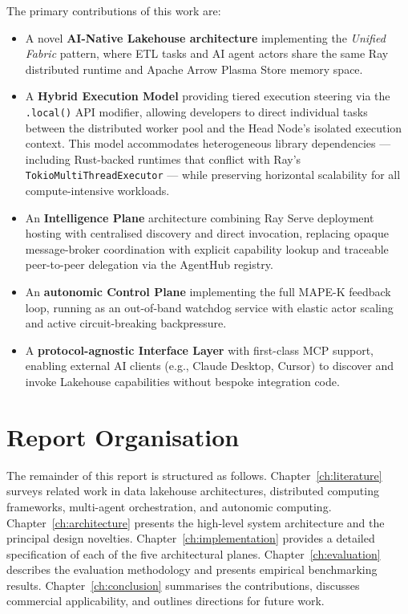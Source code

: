 \documentclass[12pt, a4paper]{report}
\begin{document}
The primary contributions of this work are:

\begin{itemize}

  \item A novel \textbf{AI-Native Lakehouse architecture} implementing the
  \emph{Unified Fabric} pattern, where ETL tasks and AI agent actors share the same Ray
  distributed runtime and Apache Arrow Plasma Store memory space.

  \item A \textbf{Hybrid Execution Model} providing tiered execution steering via the
  \texttt{.local()} API modifier, allowing developers to direct individual tasks between
  the distributed worker pool and the Head Node's isolated execution context.
  This model accommodates heterogeneous library dependencies — including Rust-backed
  runtimes that conflict with Ray's \texttt{TokioMultiThreadExecutor} — while preserving
  horizontal scalability for all compute-intensive workloads.

  \item An \textbf{Intelligence Plane} architecture combining Ray Serve deployment
  hosting with centralised discovery and direct invocation, replacing opaque
  message-broker coordination with explicit capability lookup and traceable
  peer-to-peer delegation via the AgentHub registry.

  \item An \textbf{autonomic Control Plane} implementing the full MAPE-K feedback loop,
  running as an out-of-band watchdog service with elastic actor scaling and active
  circuit-breaking backpressure.

  \item A \textbf{protocol-agnostic Interface Layer} with first-class MCP support,
  enabling external AI clients (e.g., Claude Desktop, Cursor) to discover and invoke
  Lakehouse capabilities without bespoke integration code.

\end{itemize}

\section{Report Organisation}
\label{sec:organisation}

The remainder of this report is structured as follows.
Chapter~\ref{ch:literature} surveys related work in data lakehouse architectures,
distributed computing frameworks, multi-agent orchestration, and autonomic computing.
Chapter~\ref{ch:architecture} presents the high-level system architecture and the
principal design novelties.
Chapter~\ref{ch:implementation} provides a detailed specification of each of the five
architectural planes.
Chapter~\ref{ch:evaluation} describes the evaluation methodology and presents empirical
benchmarking results.
Chapter~\ref{ch:conclusion} summarises the contributions, discusses commercial
applicability, and outlines directions for future work.
\end{document}
